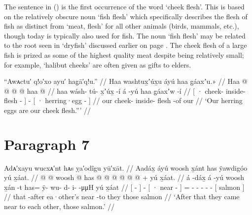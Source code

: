 \label{note:100-fish-flesh-discussion}
The sentence in (\lastx) is the first occurrence of the word  ‘cheek flesh’.
This is based on the relatively obscure noun  ‘fish flesh’ \parencite[f01/199]{leer:1973} which specifically describes the flesh of fish as distinct from  ‘meat, flesh’ for all other animals (birds, mammals, etc.), though today  is typically also used for fish.
The noun  ‘fish flesh’ may be related to the root  seen in  ‘dryfish’ discussed earlier on page \pageref{note:100-dryfish-discussion}.
The cheek flesh of a large fish is prized as some of the highest quality meat despite being relatively small; for example,  ‘halibut cheeks’ are often given as gifts to elders.

\ex\label{ex:100-93-our-cheek-flesh}%
%
\begingl
	\glpreamble	“Awᴀctu′ q!o′xo ayu′ hag̣ā′q!u.” //
	\glpreamble	Haa washtux̱ʼúx̱u áyú haa g̱áaxʼu.\!» //
	\gla	{} Haa  @ {} @ {} @ {} {}
		 @ {}
		{} haa  @ {} {} //
	\glb	{} haa wásh- tú- x̱ʼúx̱ -í {}
		á -yú
		{} haa g̱áaxʼw -í {} //
	\glc	{}[ · cheek- inside- flesh - {}]
		 -
		{}[ · herring·egg - {}] //
	\gld	{} our cheek- inside- flesh -of {}
		 {}
		{} our  {} {} //
	\glft	‘Our herring eggs are our cheek flesh.”’
		//
\endgl
\xe

\section{Paragraph 7}\label{sec:100-para-7}

\ex\label{ex:100-94-came-to-each-other}%
%
\begingl
	\glpreamble	Adᴀ′xayu wucxᴀ′nt hᴀs ỵa′odîgu yū′xāt. //
	\glpreamble	Aadáx̱ áyú woosh x̱ánt has ÿawdigóo yú x̱áat. //
	\gla	{}  @ {} {}  @ {} 
		{} woosh  @ {} {}
		has @  @ {} @ {} @ {} @ {} @ {} +
		{} yú x̱áat. {} //
	\glb	{} á -dáx̱ {} á -yú 
		{} woosh x̱án -t {}
		has= ÿ- wu- d- i-  -μμH
		{} yú x̱áat {} //
	\glc	{}[  - {}]  -
		{}[ · near - {}]
		= - - - -  -
		{}[  salmon {}] //
	\gld	{} that -after {}  {}
		{} ea·other’s near -to {}
		they  {} {} {} {} {}
		{} those salmon {} //
	\glft	‘After that they came near to each other, those salmon.’
		//
\endgl
\xe

